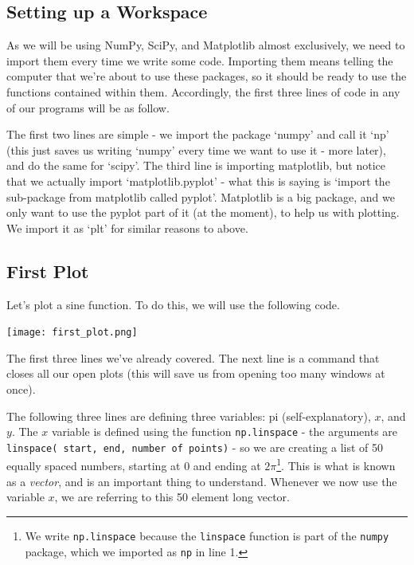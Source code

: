 \documentclass[10pt,a4paper]{memoir}
\begin{document}
\subsection{Setting up a Workspace}
As we will be using NumPy, SciPy, and Matplotlib almost exclusively, we need to import them every time we write some code. Importing them means telling the computer that we're about to use these packages, so it should be ready to use the functions contained within them. Accordingly, the first three lines of code in any of our programs will be as follow.  

The first two lines are simple - we import the package `numpy' and call it `np' (this just saves us writing `numpy' every time we want to use it - more later), and do the same for `scipy'. The third line is importing matplotlib, but notice that we actually import `matplotlib.pyplot' - what this is saying is `import the sub-package from matplotlib called pyplot'. Matplotlib is a big package, and we only want to use the pyplot part of it (at the moment), to help us with plotting. We import it as `plt' for similar reasons to above. 

\subsection{First Plot}
Let's plot a sine function. To do this, we will use the following code. 

\begin{minipage}{0.48\textwidth}
\end{minipage}
\quad
\begin{minipage}{0.48\textwidth}
		\centering
		\texttt{[image: first\_plot.png]}
\end{minipage}

The first three lines we've already covered. The next line is a command that closes all our open plots (this will save us from opening too many windows at once). 

The following three lines are defining three variables: pi (self-explanatory), $x$, and $y$. The $x$ variable is defined using the function \texttt{np.linspace} - the arguments are \texttt{linspace( start, end, number of points)} - so we are creating a list of 50 equally spaced numbers, starting at 0 and ending at $2\pi$\footnote{We write \texttt{np.linspace} because the \texttt{linspace} function is part of the \texttt{numpy} package, which we imported as \texttt{np} in line 1.}. This is what is known as a \emph{vector}, and is an important thing to understand. Whenever we now use the variable $x$, we are referring to this 50 element long vector.
\end{document}

